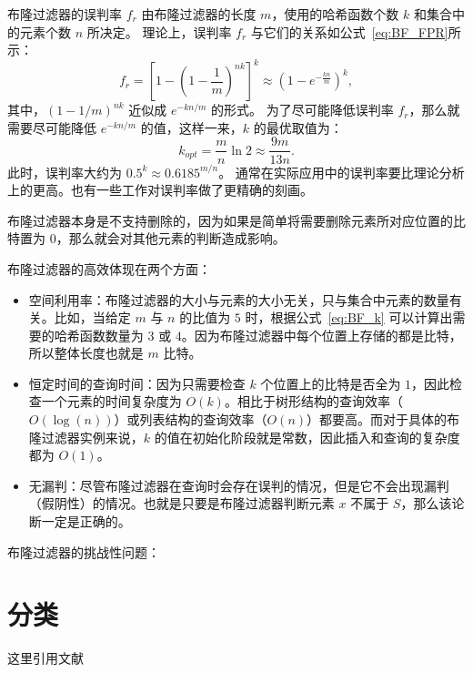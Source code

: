 布隆过滤器的误判率 $f_r$ 由布隆过滤器的长度 $m$，使用的哈希函数个数 $k$ 和集合中的元素个数 $n$ 所决定。
理论上，误判率 $f_r$ 与它们的关系如公式~\eqref{eq:BF_FPR}所示：
\begin{equation}
    f_r = \left[ 1 - \left( 1 - \frac{1}{m} \right)^{nk} \right]^k \approx \left(1 - e^{-\frac{kn}m{}}\right)^k,
    \label{eq:BF_FPR}
\end{equation}
其中，$(1-1/m)^{nk}$ 近似成 $e^{-kn/m}$ 的形式。
为了尽可能降低误判率 $f_r$，那么就需要尽可能降低 $e^{-kn/m}$ 的值，这样一来，$k$ 的最优取值为：
\begin{equation}
    k_{opt}= \frac{m}{n}\ln 2 \approx \frac{9m}{13n}.
    \label{eq:BF_k}
\end{equation}
此时，误判率大约为 $0.5^k\approx 0.6185^{m/n}$。
通常在实际应用中的误判率要比理论分析上的更高。也有一些工作对误判率做了更精确的刻画。

布隆过滤器本身是不支持删除的，因为如果是简单将需要删除元素所对应位置的比特置为 $0$，那么就会对其他元素的判断造成影响。

布隆过滤器的高效体现在两个方面：
\begin{itemize}
    \item 空间利用率：布隆过滤器的大小与元素的大小无关，只与集合中元素的数量有关。比如，当给定 $m$ 与 $n$ 的比值为 $5$ 时，根据公式~\eqref{eq:BF_k} 可以计算出需要的哈希函数数量为 $3$ 或 $4$。因为布隆过滤器中每个位置上存储的都是比特，所以整体长度也就是 $m$ 比特。
    \item 恒定时间的查询时间：因为只需要检查 $k$ 个位置上的比特是否全为 $1$，因此检查一个元素的时间复杂度为 $O(k)$。相比于树形结构的查询效率（$O(\log(n))$）或列表结构的查询效率（$O(n)$）都要高。而对于具体的布隆过滤器实例来说，$k$ 的值在初始化阶段就是常数，因此插入和查询的复杂度都为 $O(1)$。
    \item 无漏判：尽管布隆过滤器在查询时会存在误判的情况，但是它不会出现漏判（假阴性）的情况。也就是只要是布隆过滤器判断元素 $x$ 不属于 $S$，那么该论断一定是正确的。
\end{itemize}

布隆过滤器的挑战性问题：

\section{分类}

这里引用文献~\cite{2024YinSiJiHeYunSuanZhongDeGuanJianShuJuJieGouYanJiu}
